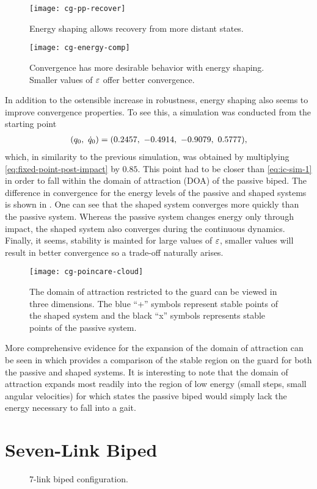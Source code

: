 \begin{figure}
  \centering
  \texttt{[image: cg-pp-recover]}
  \caption{Energy shaping allows recovery from more distant states.}
  \label{fig:pp-recover}
\end{figure}

\begin{figure}
  \centering 
  \texttt{[image: cg-energy-comp]}
  \caption{Convergence has more desirable behavior with energy shaping. Smaller
    values of $\varepsilon$ offer better convergence.}
  \label{fig:energy-comp}
  \vspace{-1em}
\end{figure}

In addition to the ostensible increase in robustness, energy shaping also seems
to improve convergence properties.
%
To see this, a simulation was conducted from the starting point
%
\begin{align}
  (q_{0}, \ \dot{q}_{0}) = (0.2457, \ -0.4914, \ -0.9079, \ 0.5777),
\end{align}
%
which, in similarity to the previous simulation, was obtained by multiplying \eqref{eq:fixed-point-post-impact} by $0.85$.
%
This point had to be closer than \eqref{eq:ic-sim-1} in order to fall within the domain of attraction (DOA) of the passive biped.
%
The difference in convergence for the energy levels of the passive and shaped
systems is shown in  .
%
One can see that the shaped system converges more quickly than the passive
system.
%
Whereas the passive system changes energy only through impact, the shaped system
also converges during the continuous dynamics.
%
Finally, it seems, stability is mainted for large values of $\varepsilon$,
smaller values will result in better convergence so a trade-off naturally
arises.

\begin{figure}[tp!]
  \centering
    \centering
    \texttt{[image: cg-poincare-cloud]}
    \caption{The domain of attraction restricted to the guard can be viewed in
      three dimensions.
      The blue ``+'' symbols represent stable points of the shaped system and the
      black ``x'' symbols represents stable points of the passive system.}
    \label{fig:point-cloud}
  \vspace{-1em}
\end{figure}

More comprehensive evidence for the expansion of the domain of attraction can be
seen in  which provides a comparison of the stable
region on the guard for both the passive and shaped systems.
%
It is interesting to note that the domain of attraction expands most readily
into the region of low energy (small steps, small angular velocities) for which
states the passive biped would simply lack the energy necessary to fall into a
gait.

\section{Seven-Link Biped}

\begin{figure}
  \centering
  \def\svgwidth{0.5\columnwidth}
  
  \caption{7-link biped configuration.}
\end{figure}
